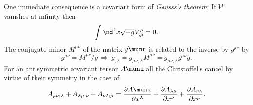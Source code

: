 One immediate consequence is a covariant form of \emph{Gausss's theorem}: If $V^\mu$ vanishes at infinity then
\begin{equation}
\int \md^4 x \sqrt{-g} V^\mu_{;\mu} = 0.
\end{equation}
The conjugate minor $M^{\mu \nu}$ of the matrix $g\munu$ is related to the inverse by $g^{\mu \nu}$ by
\begin{equation}
g^{\mu \nu} = M^{\mu \nu} / g \, \Rightarrow\; g_{,\lambda} = g_{\mu \nu, \lambda} M^{\mu \nu} = g_{\mu \nu,\lambda}g^{\mu \nu} g.
\end{equation}
For an antisymmetric covariant tensor $A\munu$ all the Christoffel's cancel by virtue of their symmetry in the case of
\begin{equation}
	A_{\mu \nu;\lambda} + A_{\lambda \mu;\nu} + A_{\nu \lambda ; \mu} = \frac{\partial A\munu}{\partial x^\lambda} + \frac{\partial A_{\lambda \mu}}{\partial x^\nu} + \frac{\partial A_{\nu \lambda}}{\partial x^\mu}.
\end{equation}

